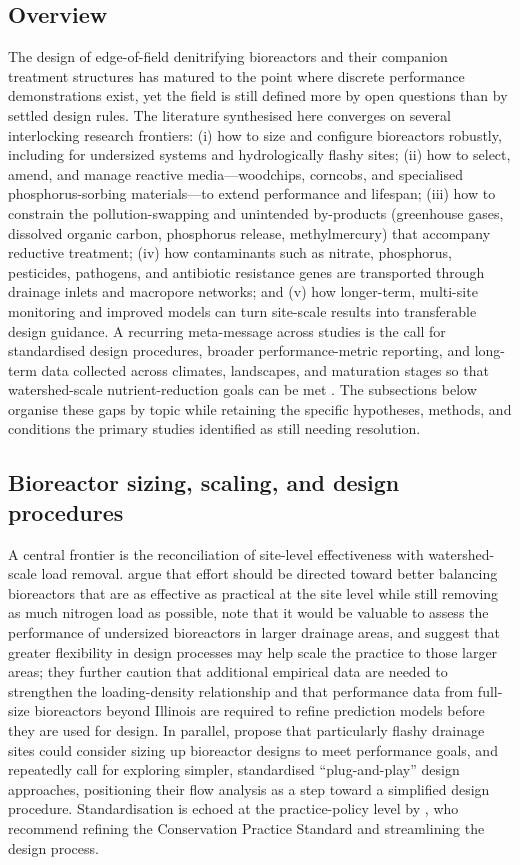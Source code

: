 \subsection{Overview}
The design of edge-of-field denitrifying bioreactors and their companion treatment structures has matured to the point where discrete performance demonstrations exist, yet the field is still defined more by open questions than by settled design rules. The literature synthesised here converges on several interlocking research frontiers: (i) how to size and configure bioreactors robustly, including for undersized systems and hydrologically flashy sites; (ii) how to select, amend, and manage reactive media---woodchips, corncobs, and specialised phosphorus-sorbing materials---to extend performance and lifespan; (iii) how to constrain the pollution-swapping and unintended by-products (greenhouse gases, dissolved organic carbon, phosphorus release, methylmercury) that accompany reductive treatment; (iv) how contaminants such as nitrate, phosphorus, pesticides, pathogens, and antibiotic resistance genes are transported through drainage inlets and macropore networks; and (v) how longer-term, multi-site monitoring and improved models can turn site-scale results into transferable design guidance. A recurring meta-message across studies is the call for standardised design procedures, broader performance-metric reporting, and long-term data collected across climates, landscapes, and maturation stages so that watershed-scale nutrient-reduction goals can be met \parencite{Christianson2021,Maxwell2022,Bell2015}. The subsections below organise these gaps by topic while retaining the specific hypotheses, methods, and conditions the primary studies identified as still needing resolution.

\subsection{Bioreactor sizing, scaling, and design procedures}
A central frontier is the reconciliation of site-level effectiveness with watershed-scale load removal. \textcite{Christianson2026} argue that effort should be directed toward better balancing bioreactors that are as effective as practical at the site level while still removing as much nitrogen load as possible, note that it would be valuable to assess the performance of undersized bioreactors in larger drainage areas, and suggest that greater flexibility in design processes may help scale the practice to those larger areas; they further caution that additional empirical data are needed to strengthen the loading-density relationship and that performance data from full-size bioreactors beyond Illinois are required to refine prediction models before they are used for design. In parallel, \textcite{Dougherty2020b} propose that particularly flashy drainage sites could consider sizing up bioreactor designs to meet performance goals, and repeatedly call for exploring simpler, standardised ``plug-and-play'' design approaches, positioning their flow analysis as a step toward a simplified design procedure. Standardisation is echoed at the practice-policy level by \textcite{Christianson2021}, who recommend refining the Conservation Practice Standard and streamlining the design process.

